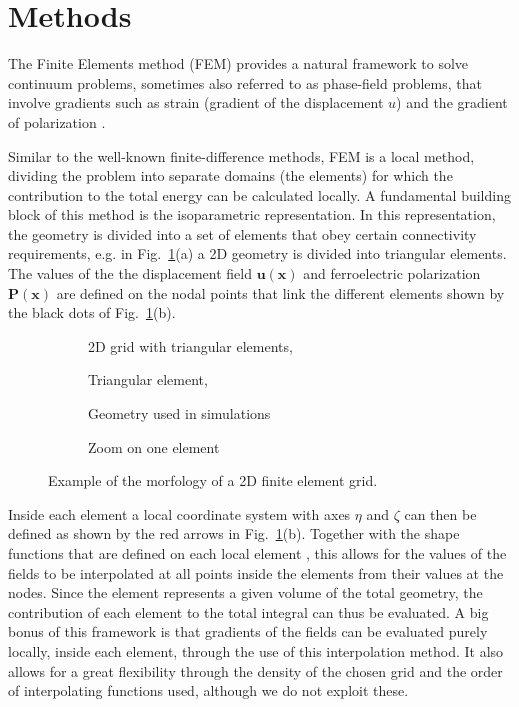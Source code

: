 \section{Methods}
The Finite Elements method (FEM) provides a natural framework to solve continuum problems, sometimes also referred to as phase-field problems, that involve gradients such as strain (gradient of the displacement $u$) and the gradient of polarization \cite{Biner}.

Similar to the well-known finite-difference methods, FEM is a local method, dividing the problem into separate domains (the elements) for which the contribution to the total energy can be calculated locally.
A fundamental building block of this method is the isoparametric representation.
In this representation, the geometry is divided into a set of elements that obey certain connectivity requirements, e.g. in Fig.~\ref{fig:BTO_fem}(a) a 2D geometry is divided into triangular elements.
The values of the the displacement field $\mathbf{u}(\mathbf{x})$ and ferroelectric polarization $\mathbf{P}(\mathbf{x})$ are defined on the nodal points that link the different elements shown by the black dots of Fig.~\ref{fig:BTO_fem}(b).    
\begin{figure}
	\begin{subfigure}{0.49\textwidth}
		\caption{2D grid with triangular elements, \cite{Biner}}
	\end{subfigure}
	\begin{subfigure}{0.49\textwidth}
		\caption{Triangular element, }
	\end{subfigure}
	\begin{subfigure}{0.49\textwidth}
		\caption{Geometry used in simulations}
	\end{subfigure}
	\begin{subfigure}{0.49\textwidth}
		\caption{Zoom on one element}
	\end{subfigure}
	\caption{\label{fig:BTO_fem} Example of the morfology of a 2D finite element grid.}
\end{figure}
Inside each element a local coordinate system with axes $\eta$ and $\zeta$ can then be defined as shown by the red arrows in Fig.~\ref{fig:BTO_fem}(b).
Together with the shape functions that are defined on each local element , this allows for the values of the fields to be interpolated at all points inside the elements from their values at the nodes.
Since the element represents a given volume of the total geometry, the contribution of each element to the total integral can thus be evaluated.
A big bonus of this framework is that gradients of the fields can be evaluated purely locally, inside each element, through the use of this interpolation method.
It also allows for a great flexibility through the density of the chosen grid and the order of interpolating functions used, although we do not exploit these.

